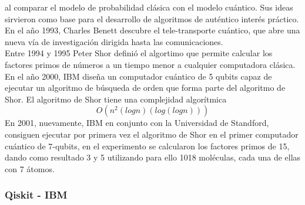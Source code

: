 al comparar el modelo de probabilidad clásica con el modelo cuántico. Sus ideas sirvieron como base para el desarrollo de algoritmos de auténtico interés práctico. En el año 1993, Charles Benett descubre 
el tele-transporte cuántico, que abre una nueva vía de investigación dirigida hasta las comunicaciones.\\
Entre 1994 y 1995 Peter Shor definió el algortimo que permite calcular los factores primos de números a un tiempo menor a cualquier computadora clásica. En el año 2000, IBM diseña un computador cuántico de 5 qubits capaz de 
ejecutar un algoritmo de búsqueda de orden que forma parte del algoritmo de Shor. El algoritmo de Shor tiene una complejidad algorítmica \cite{Shor1997}
\begin{equation}
    O(n^2(logn)(log(logn)))
    \label{eq:compledidad_cuantica}
\end{equation}
 En 2001, nuevamente, IBM en conjunto con la Universidad de 
Standford, consiguen ejecutar por primera vez el algoritmo de Shor en el primer computador cuántico de 7-qubits, en el experimento se calcularon los factores primos de 15, dando como resultado 3 y 5 utilizando para ello 1018 moléculas, cada una de ellas con 7 átomos.
\subsubsection{Qiskit - IBM}

